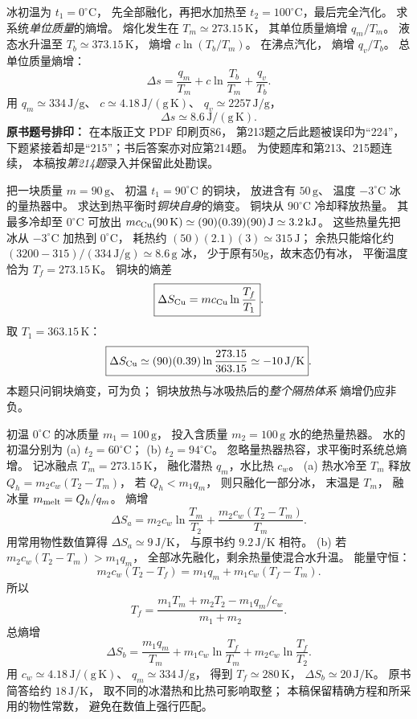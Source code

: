 冰初温为 $t_1=0^\circ\mathrm C$，
先全部融化，再把水加热至
$t_2=100^\circ\mathrm C$，最后完全汽化。
求系统\emph{单位质量}的熵增。
\exsolution
熔化发生在
$T_m\simeq273.15\,\mathrm K$，
其单位质量熵增
$q_m/T_m$。
液态水升温至
$T_b\simeq373.15\,\mathrm K$，
熵增
$c\ln(T_b/T_m)$。
在沸点汽化，
熵增
$q_v/T_b$。
总单位质量熵增：
\[
\boxed{\Delta s=
\frac{q_m}{T_m}
+c\ln\frac{T_b}{T_m}
+\frac{q_v}{T_b}}.
\]
用
$q_m\simeq334\,\mathrm{J/g}$、
$c\simeq4.18\,\mathrm{J/(g\,K)}$、
$q_v\simeq2257\,\mathrm{J/g}$，
\[
\boxed{\Delta s\simeq8.6\,\mathrm{J/(g\,K)}}.
\]
\excheck \textbf{原书题号排印：}
在本版正文 PDF 印刷页86，
第213题之后此题被误印为“224”，
下题紧接着却是“215”；书后答案亦对应第214题。
为使题库和第213、215题连续，
本稿按\emph{第214题}录入并保留此处勘误。

把一块质量 $m=90\,\mathrm g$、
初温 $t_1=90^\circ\mathrm C$ 的铜块，
放进含有 $50\,\mathrm g$、
温度 $-3^\circ\mathrm C$ 冰的量热器中。
求达到热平衡时\emph{铜块自身}的熵变。
\exsolution
铜块从 $90^\circ\mathrm C$ 冷却释放热量。
其最多冷却至 $0^\circ\mathrm C$ 可放出
$m c_{\rm Cu}(90\,\mathrm K)
\simeq(90)(0.39)(90)\,\mathrm J
\simeq3.2\,\mathrm{kJ}$。
这些热量先把冰从 $-3^\circ\mathrm C$
加热到 $0^\circ\mathrm C$，
耗热约
$(50)(2.1)(3)\simeq315\,\mathrm J$；
余热只能熔化约
$(3200-315)/(334\,\mathrm{J/g})
\simeq8.6\,\mathrm g$ 冰，
少于原有50g，故末态仍有冰，
平衡温度恰为 $T_f=273.15\,\mathrm K$。
铜块的熵差
\[
\boxed{\Delta S_{\rm Cu}=
m c_{\rm Cu}\ln\frac{T_f}{T_1}}.
\]
取 $T_1=363.15\,\mathrm K$：
\[
\boxed{\Delta S_{\rm Cu}\simeq
(90)(0.39)\ln\frac{273.15}{363.15}
\simeq-10\,\mathrm{J/K}}.
\]
\excheck 本题只问铜块熵变，可为负；
铜块放热与冰吸热后的\emph{整个隔热体系}
熵增仍应非负。

初温 $0^\circ\mathrm C$ 的冰质量
$m_1=100\,\mathrm g$，
投入含质量
$m_2=100\,\mathrm g$ 水的绝热量热器。
水的初温分别为
(a) $t_2=60^\circ\mathrm C$；
(b) $t_2=94^\circ\mathrm C$。
忽略量热器热容，求平衡时系统总熵增。
\exsolution
记冰融点 $T_m=273.15\,\mathrm K$，
融化潜热 $q_m$，水比热 $c_w$。
(a) 热水冷至 $T_m$ 释放
$Q_h=m_2c_w(T_2-T_m)$，
若
$Q_h<m_1q_m$，
则只融化一部分冰，
末温是 $T_m$，
融冰量 $m_{\rm melt}=Q_h/q_m$。
熵增
\[
\boxed{\Delta S_a=
m_2c_w\ln\frac{T_m}{T_2}
+\frac{m_2c_w(T_2-T_m)}{T_m}}.
\]
用常用物性数值算得
$\Delta S_a\simeq9\,\mathrm{J/K}$，
与原书约 $9.2\,\mathrm{J/K}$ 相符。
(b) 若
$m_2c_w(T_2-T_m)>m_1q_m$，
全部冰先融化，剩余热量使混合水升温。
能量守恒：
\[
m_2c_w(T_2-T_f)=m_1q_m+
m_1c_w(T_f-T_m).
\]
所以
\[
\boxed{T_f=\frac{m_1T_m+m_2T_2-m_1q_m/c_w}
{m_1+m_2}}.
\]
总熵增
\[
\boxed{\Delta S_b=
\frac{m_1q_m}{T_m}
+m_1c_w\ln\frac{T_f}{T_m}
+m_2c_w\ln\frac{T_f}{T_2}}.
\]
用 $c_w\simeq4.18\,\mathrm{J/(g\,K)}$、
$q_m\simeq334\,\mathrm{J/g}$，
得到 $T_f\simeq280\,\mathrm K$，
$\Delta S_b\simeq20\,\mathrm{J/K}$。
\excheck 原书简答给约 $18\,\mathrm{J/K}$，
取不同的冰潜热和比热可影响取整；
本稿保留精确方程和所采用的物性常数，
避免在数值上强行匹配。

